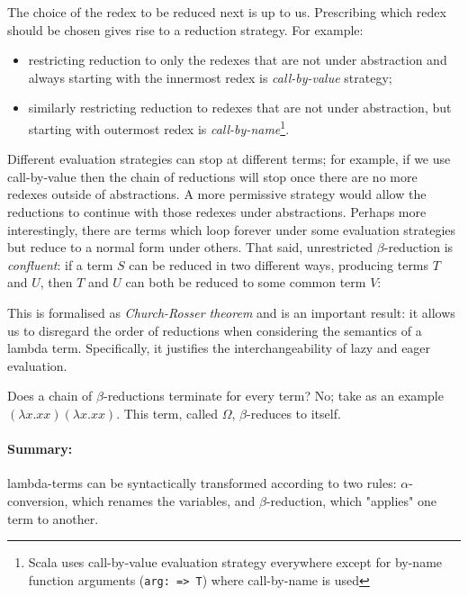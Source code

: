 \documentclass[11pt,twoside,a4paper]{article} %
\begin{document}
The choice of the redex to be reduced next is up to us. Prescribing which redex
should be chosen gives rise to a reduction strategy. For example:
\begin{itemize}
\item restricting reduction to only the redexes that are not under abstraction
and always starting with the innermost redex is \emph{call-by-value} strategy;
\item similarly restricting reduction to redexes that are not under
abstraction, but starting with outermost redex is \emph{call-by-name}\footnote{
Scala uses call-by-value evaluation strategy everywhere except for by-name
function arguments (\texttt{arg: => T}) where call-by-name is used}.
\end{itemize}
Different evaluation strategies can stop at different terms; for example, if we
use call-by-value then the chain of reductions will stop once there are no more
redexes outside of abstractions. A more permissive strategy would allow the
reductions to continue with those redexes under abstractions. Perhaps more
interestingly, there are terms which loop forever under some evaluation
strategies but reduce to a normal form under others. That said, unrestricted 
$\beta$-reduction is \emph{confluent}: if a term $S$ can be reduced in two 
different ways, producing terms $T$ and $U$, then $T$ and $U$ can both be reduced 
to some common term $V$:
\begin{center}
\end{center}
This is formalised as \emph{Church-Rosser theorem} and is an
important result: it allows us to disregard the order of reductions when
considering the semantics of a lambda term. Specifically, it justifies the
interchangeability of lazy and eager evaluation.

Does a chain of $\beta$-reductions terminate for every term? No; take as an example 
$(\lambda x.xx) (\lambda x.xx)$. This term, called $\Omega$, $\beta$-reduces to 
itself.

\paragraph{Summary:} lambda-terms can be syntactically transformed according to 
two rules: $\alpha$-conversion, which renames the variables, and $\beta$-reduction,
which "applies" one term to another.
\end{document}
